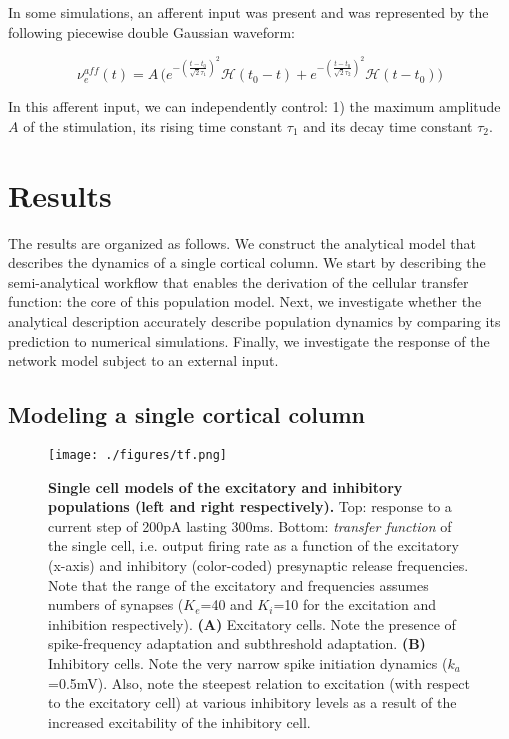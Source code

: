 \documentclass[8pt, colorlinks, a4paper]{article}
\begin{document}
In some simulations, an afferent input was present and was represented
by the following piecewise double Gaussian waveform:

\begin{equation}
  \label{eq:input}
  \nu_e^{aff}(t) = A \, \Big(
  e^{-(\frac{t-t_0}{\sqrt{2} \tau_1})^2} \mathcal{H}(t_0-t)+
  e^{-(\frac{t-t_0}{\sqrt{2} \tau_2})^2} \mathcal{H}(t-t_0)
  \Big)
\end{equation}

In this afferent input, we can independently control: 1) the maximum
amplitude \(A\) of the stimulation, its rising time constant
\(\tau_1\) and its decay time constant \(\tau_2\).


\section{Results}
\label{sec-4}
\normalsize

The results are organized as follows. We construct the analytical
model that describes the dynamics of a single cortical column. We
start by describing the semi-analytical workflow that enables the
derivation of the cellular transfer function: the core of this
population model. Next, we investigate whether the analytical
description accurately describe population dynamics by comparing its
prediction to numerical simulations. Finally, we investigate the
response of the network model subject to an external input.

\subsection{Modeling a single cortical column}
\label{sec-4-1}

\begin{figure*}
\centering
\texttt{[image: ./figures/tf.png]}
\caption{\label{fig:tf}\textbf{Single cell models of the excitatory
    and inhibitory populations (left and right respectively).} Top:
  response to a current step of 200pA lasting 300ms. Bottom:
  \emph{transfer function} of the single cell, i.e. output firing rate
  as a function of the excitatory (x-axis) and inhibitory
  (color-coded) presynaptic release frequencies. Note that the range
  of the excitatory and frequencies assumes numbers of synapses
  (\(K_e\)=40 and \(K_i\)=10 for the excitation and inhibition
  respectively).  \textbf{(A)} Excitatory cells. Note the presence of
  spike-frequency adaptation and subthreshold adaptation. \textbf{(B)}
  Inhibitory cells. Note the very narrow spike initiation dynamics
  (\(k_a\)=0.5mV). Also, note the steepest relation to excitation
  (with respect to the excitatory cell) at various inhibitory levels
  as a result of the increased excitability of the inhibitory cell.}
\end{figure*}
\end{document}
